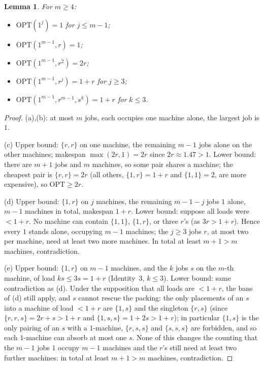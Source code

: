\documentclass[11pt]{article}
\newtheorem{lemma}[theorem]{Lemma}
\theoremstyle{definition}
\newcommand{\opt}{\mathrm{OPT}}
\begin{document}
\begin{lemma}
\label{lem:prefix}
For $m\ge4$:
\begin{itemize}
\item[\emph{(a)}] $\opt(1^{j})=1$ for $j\le m-1$;
\item[\emph{(b)}] $\opt(1^{m-1},r)=1$;
\item[\emph{(c)}] $\opt(1^{m-1},r^{2})=2r$;
\item[\emph{(d)}] $\opt(1^{m-1},r^{j})=1+r$ for $j\ge3$;
\item[\emph{(e)}] $\opt(1^{m-1},r^{m-1},s^{k})=1+r$ for $k\le3$.
\end{itemize}
\end{lemma}
\begin{proof}
(a),(b): at most $m$ jobs, each occupies one machine alone, the largest job
is $1$.

(c) Upper bound: $\{r,r\}$ on one machine, the remaining $m-1$ jobs alone on
the other machines; makespan $\max(2r,1)=2r$ since $2r\approx1.47>1$. Lower
bound: there are $m+1$ jobs and $m$ machines, so some pair shares a machine;
the cheapest pair is $\{r,r\}=2r$ (all others, $\{1,r\}=1+r$ and $\{1,1\}=2$,
are more expensive), so $\opt\ge2r$.

(d) Upper bound: $\{1,r\}$ on $j$ machines, the remaining $m-1-j$ jobs $1$
alone, $m-1$ machines in total, makespan $1+r$. Lower bound: suppose all
loads were $<1+r$. No machine can contain $\{1,1\}$, $\{1,r\}$, or three
$r$'s (as $3r>1+r$). Hence every $1$ stands alone, occupying $m-1$
machines; the $j\ge3$ jobs $r$, at most two per machine, need at least two
more machines. In total at least $m+1>m$ machines, contradiction.

(e) Upper bound: $\{1,r\}$ on $m-1$ machines, and the $k$ jobs $s$ on the
$m$-th machine, of load $ks\le3s=1+r$ (Identity~3, $k\le3$). Lower bound:
same contradiction as (d). Under the supposition that all loads are
$<1+r$, the bans of (d) still apply, and $s$ cannot rescue the packing: the
only placements of an $s$ into a machine of load $<1+r$ are $\{1,s\}$ and
the singleton $\{r,s\}$ (since $\{r,r,s\}=2r+s>1+r$ and
$\{1,s,s\}=1+2s>1+r$); in particular $\{1,s\}$ is the only pairing of an
$s$ with a $1$-machine, $\{r,s,s\}$ and $\{s,s,s\}$ are forbidden, and so
each $1$-machine can absorb at most one $s$. None of this changes the
counting that the $m-1$ jobs $1$ occupy $m-1$ machines and the $r$'s still
need at least two further machines: in total at least $m+1>m$ machines,
contradiction.
\end{proof}
\end{document}
